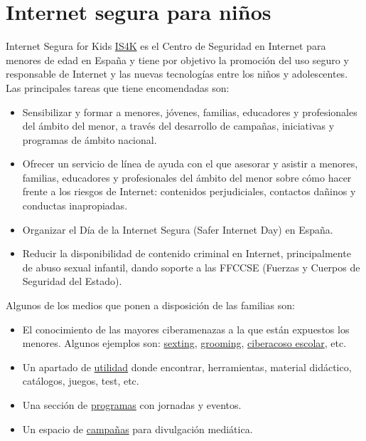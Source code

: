 \documentclass[
  spanish,
  a4paper,
  openany]{book}
\begin{document}
\hypertarget{internet-segura-para-niuxf1os}{%
\section{Internet segura para niños}\label{internet-segura-para-niuxf1os}}

Internet Segura for Kids \href{https://www.is4k.es/}{IS4K} es el Centro de Seguridad en Internet para menores de edad en España y tiene por objetivo la promoción del uso seguro y responsable de Internet y las nuevas tecnologías entre los niños y adolescentes. Las principales tareas que tiene encomendadas son:

\begin{itemize}
\item
  Sensibilizar y formar a menores, jóvenes, familias, educadores y profesionales del ámbito del menor, a través del desarrollo de campañas, iniciativas y programas de ámbito nacional.
\item
  Ofrecer un servicio de línea de ayuda con el que asesorar y asistir a menores, familias, educadores y profesionales del ámbito del menor sobre cómo hacer frente a los riesgos de Internet: contenidos perjudiciales, contactos dañinos y conductas inapropiadas.
\item
  Organizar el Día de la Internet Segura (Safer Internet Day) en España.
\item
  Reducir la disponibilidad de contenido criminal en Internet, principalmente de abuso sexual infantil, dando soporte a las FFCCSE (Fuerzas y Cuerpos de Seguridad del Estado).
\end{itemize}

Algunos de los medios que ponen a disposición de las familias son:

\begin{itemize}
\item
  El conocimiento de las mayores ciberamenazas a la que están expuestos los menores. Algunos ejemplos son: \href{https://www.is4k.es/necesitas-saber/sexting}{sexting}, \href{https://www.is4k.es/necesitas-saber/grooming}{grooming}, \href{https://www.is4k.es/necesitas-saber/ciberacoso-escolar}{ciberacoso escolar}, etc.
\item
  Un apartado de \href{https://www.is4k.es/de-utilidad}{utilidad} donde encontrar, herramientas, material didáctico, catálogos, juegos, test, etc.
\item
  Una sección de \href{https://www.is4k.es/programas}{programas} con jornadas y eventos.
\item
  Un espacio de \href{https://www.is4k.es/campanas}{campañas} para divulgación mediática.
\end{itemize}
\end{document}
